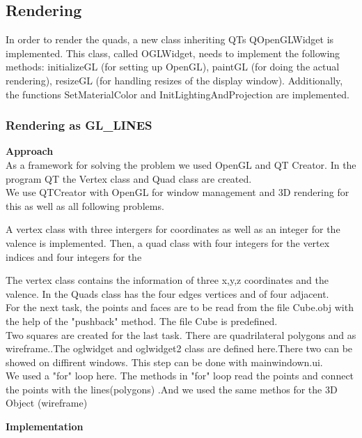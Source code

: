 \documentclass[12pt,a4paper]{scrartcl}
\begin{document}
\subsection{Rendering}
In order to render the quads, a new class inheriting QTs QOpenGLWidget is implemented. This class, called OGLWidget, needs to implement the following methods: initializeGL (for setting up OpenGL), paintGL (for doing the actual rendering), resizeGL (for handling resizes of the display window). Additionally, the functions SetMaterialColor and InitLightingAndProjection are implemented.

\subsubsection{Rendering as GL_LINES}


\textbf{Approach}\\
As a framework for solving the problem we used OpenGL and QT Creator. In the program QT the Vertex class and Quad class are created.\\

We use QTCreator with OpenGL for window management and 3D rendering for this as well as all following problems.

A vertex class with three intergers for coordinates as well as an integer for the valence is implemented.
Then, a quad class with four integers for the vertex indices and four integers for the 

The vertex class contains the information of three x,y,z coordinates and the valence. In the Quads class has the four edges vertices and of four adjacent.\\
For the next task, the points and faces are to be read from the file Cube.obj with the help of the "pushback" method. The file Cube is predefined. \\
Two squares are created for the last task. There are quadrilateral polygons and as wireframe..The oglwidget and oglwidget2 class are defined here.There two can be showed on diffirent windows. This step can be done with mainwindown.ui.\\
We used a "for" loop here. The methods in "for" loop read the points and connect the points with the lines(polygons) .And we used the same methos for the 3D Object (wireframe)\\[0,5cm]

\newpage

\textbf{Implementation}\\
\end{document}
